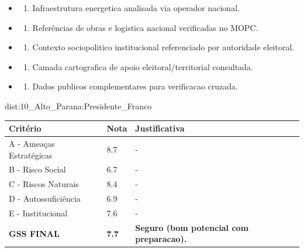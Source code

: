 {\begin{itemize}
\item
  \begin{enumerate}
  \def\labelenumi{\arabic{enumi})}
  \setcounter{enumi}{7}
  \tightlist
  \item
    Infraestrutura energetica analisada via operador nacional.
  \end{enumerate}
\item
  \begin{enumerate}
  \def\labelenumi{\arabic{enumi})}
  \setcounter{enumi}{8}
  \tightlist
  \item
    Referências de obras e logistica nacional verificadas no MOPC.
  \end{enumerate}
\item
  \begin{enumerate}
  \def\labelenumi{\arabic{enumi})}
  \setcounter{enumi}{9}
  \tightlist
  \item
    Contexto sociopolitico institucional referenciado por autoridade
    eleitoral.
  \end{enumerate}
\item
  \begin{enumerate}
  \def\labelenumi{\arabic{enumi})}
  \setcounter{enumi}{10}
  \tightlist
  \item
    Camada cartografica de apoio eleitoral/\allowbreak territorial consultada.
  \end{enumerate}
\item
  \begin{enumerate}
  \def\labelenumi{\arabic{enumi})}
  \setcounter{enumi}{11}
  \tightlist
  \item
    Dados publicos complementares para verificacao cruzada.
  \end{enumerate}
\end{itemize}}{dist:10_Alto_Parana:Presidente_Franco}
\begin{table}[ht!]
\small \begin{tabular}{p{3.0cm}p{0.8cm}p{6.0cm}} \toprule
\textbf{Critério} & \textbf{Nota} & \textbf{Justificativa} \\ \midrule
A - Ameaças Estratégicas & 8.7 & - \\
B - Risco Social & 6.7 & - \\
C - Riscos Naturais & 8.4 & - \\
D - Autossuficiência & 6.9 & - \\
E - Institucional & 7.6 & - \\
\midrule \textbf{GSS FINAL} & \textbf{7.7} & \textbf{Seguro (bom potencial com preparacao).} \\ \bottomrule \end{tabular}
\end{table}
